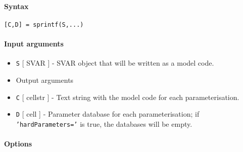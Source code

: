 


	\paragraph{Syntax}\label{syntax}

\begin{verbatim}
[C,D] = sprintf(S,...)
\end{verbatim}

\paragraph{Input arguments}\label{input-arguments}

\begin{itemize}
\item
  \texttt{S} {[} SVAR {]} - SVAR object that will be written as a model
  code.
\item
  Output arguments
\item
  \texttt{C} {[} cellstr {]} - Text string with the model code for each
  parameterisation.
\item
  \texttt{D} {[} cell {]} - Parameter database for each
  parameterisation; if \texttt{'hardParameters='} is true, the databases
  will be empty.
\end{itemize}

\paragraph{Options}\label{options}


